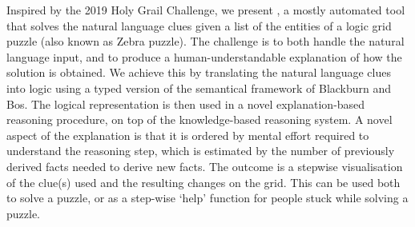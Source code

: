 Inspired by the 2019 Holy Grail Challenge, we present \ourtool, a mostly automated tool that solves the natural language clues given a list of the entities of a logic grid puzzle (also known as Zebra puzzle). The challenge is to both handle the natural language input, and to produce a human-understandable explanation of how the solution is obtained.
We achieve this by translating the natural language clues into logic using a typed version of the semantical framework of Blackburn and Bos. The logical representation is then used in a novel explanation-based reasoning procedure, on top of the \idp knowledge-based reasoning system. A novel aspect of the explanation is that it is ordered by mental effort required to understand the reasoning step, which is estimated by the number of previously derived facts needed to derive new facts. The outcome is a stepwise visualisation of the clue(s) used and the resulting changes on the grid.
This can be used both to solve a puzzle, or as a step-wise `help' function for people stuck while solving a puzzle.

